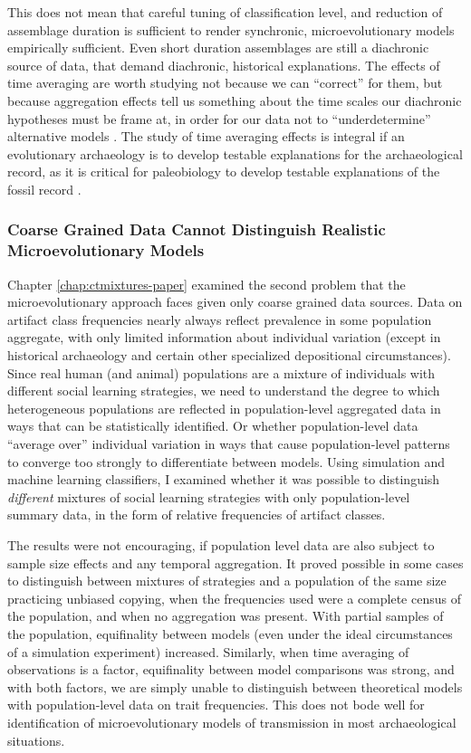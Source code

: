 This does not mean that careful tuning of classification level, and reduction of assemblage duration is sufficient to render synchronic, microevolutionary models empirically sufficient.  Even short duration assemblages are still a diachronic source of data, that demand diachronic, historical explanations.  The effects of time averaging are worth studying not because we can ``correct'' for them, but because aggregation effects tell us something about the time scales our diachronic hypotheses must be frame at, in order for our data not to ``underdetermine'' alternative models \citep{perreault2019quality}.  The study of time averaging effects is integral if an evolutionary archaeology is to develop testable explanations for the archaeological record, as it is critical for paleobiology to develop testable explanations of the fossil record \citep{kowalewski1996time}.


\subsubsection{Coarse Grained Data Cannot Distinguish Realistic Microevolutionary Models}\label{conc:sec:conc-ctmixtures}

Chapter \ref{chap:ctmixtures-paper} examined the second problem that the microevolutionary approach faces given only coarse grained data sources.  Data on artifact class frequencies nearly always reflect prevalence in some population aggregate, with only limited information about individual variation (except in historical archaeology and certain other specialized depositional circumstances). 
Since real human (and animal) populations are a mixture of individuals with different social learning strategies, we need to understand the degree to which heterogeneous populations are reflected in population-level aggregated data in ways that can be statistically identified.  Or whether population-level data ``average over'' individual variation in ways that cause population-level patterns to converge too strongly to differentiate between models.
Using simulation and machine learning classifiers, I examined whether it was possible to distinguish \emph{different} mixtures of social learning strategies with only population-level summary data, in the form of relative frequencies of artifact classes.

The results were not encouraging, if population level data are also subject to sample size effects and any temporal aggregation.  It proved possible in some cases to distinguish between mixtures of strategies and a population of the same size practicing unbiased copying, when the frequencies used were a complete census of the population, and when no aggregation was present.  With partial samples of the population, equifinality between models (even under the ideal circumstances of a simulation experiment) increased.  Similarly, when time averaging of observations is a factor, equifinality between model comparisons was strong, and with both factors, we are simply unable to distinguish between theoretical models with population-level data on trait frequencies.  This does not bode well for identification of microevolutionary models of transmission in most archaeological situations.  


